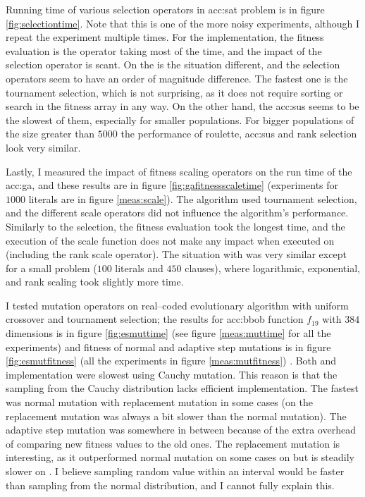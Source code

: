 Running time of various selection operators in \acrshort{acc:sat} problem is in figure \ref{fig:selectiontime}. Note that this is one of the more noisy experiments, although I repeat the experiment multiple times. For the \cpu implementation, the fitness evaluation is the operator taking most of the time, and the impact of the selection operator is scant. On the \gpu is the situation different, and the selection operators seem to have an order of magnitude difference. The fastest one is the tournament selection, which is not surprising, as it does not require sorting or search in the fitness array in any way. On the other hand, the \acrshort{acc:sus} seems to be the slowest of them, especially for smaller populations. For bigger populations of the size greater than $5000$ the performance of roulette, \acrshort{acc:sus} and rank selection look very similar.

Lastly, I measured the impact of fitness scaling operators on the run time of the \acrshort{acc:ga}, and these results are in figure \ref{fig:gafitnessscaletime} (experiments for $1000$ literals are in figure \ref{meas:scale}). The algorithm used tournament selection, and the different scale operators did not influence the algorithm's performance. Similarly to the selection, the fitness evaluation took the longest time, and the execution of the scale function does not make any impact when executed on \cpu (including the rank scale operator). The situation with \gpu was very similar except for a small problem ($100$ literals and $450$ clauses), where logarithmic, exponential, and rank scaling took slightly more time.

I tested mutation operators on real--coded evolutionary algorithm with uniform crossover and tournament selection; the results for \acrshort{acc:bbob} function $f_{19}$ with $384$ dimensions is in figure \ref{fig:esmuttime} (see figure \ref{meas:muttime} for all the experiments) and fitness of normal and adaptive step mutations is in figure \ref{fig:esmutfitness} (all the experiments in figure \ref{meas:mutfitness}) . Both \cpu and \gpu implementation were slowest using Cauchy mutation. This reason is that the sampling from the Cauchy distribution lacks efficient implementation. The fastest was normal mutation with replacement mutation in some \gpu cases (on \cpu the replacement mutation was always a bit slower than the normal mutation). The adaptive step mutation was somewhere in between because of the extra overhead of comparing new fitness values to the old ones. The replacement mutation is interesting, as it outperformed normal mutation on some cases on \gpu but is steadily slower on \cpuns. I believe sampling random value within an interval would be faster than sampling from the normal distribution, and I cannot fully explain this.

